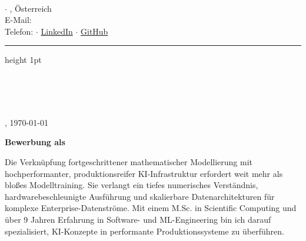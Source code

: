 \documentclass[11pt,a4paper]{article}
\begin{document}
\begin{minipage}[t]{0.55\textwidth}
    {\Large \bfseries \color{primary} \meinName}\\[0.2em]
    {\small \color{accent} \bfseries \stellenTitel}
\end{minipage}
\begin{minipage}[t]{0.45\textwidth}
    \raggedleft \footnotesize \color{textgray}
    \meineStrasse $\cdot$ \meinOrt, Österreich\\
    E-Mail: \href{mailto:\meineEmail}{\meineEmail}\\
    Telefon: \meineTel $\cdot$ \href{\meinLinkedin}{LinkedIn} $\cdot$ \href{\meinGithub}{GitHub}
\end{minipage}

\vspace{0.8em}
\color{accent}\hrule height 1pt
\vspace{1.0em}

\begin{minipage}[t]{0.55\textwidth}
    \color{primary} \small
    \textbf{\firmenName}\\[0.15em]
    \ansprechPartner\\[0.15em]
    \firmenAdresse\\[0.15em]
\end{minipage}
\begin{minipage}[t]{0.45\textwidth}
    \raggedleft \small \color{textgray}
    \meinOrt, \today
\end{minipage}

\vspace{1.2em}

\vspace{0.8cm}
{\Large\bfseries\color{primary} Bewerbung als \stellenTitel}


\vspace{0.6em}

\color{primary} \small

\anrede

Die Verknüpfung fortgeschrittener mathematischer Modellierung mit hochperformanter, produktionsreifer KI-Infrastruktur erfordert weit mehr als bloßes Modelltraining. Sie verlangt ein tiefes numerisches Verständnis, hardwarebeschleunigte Ausführung und skalierbare Datenarchitekturen für komplexe Enterprise-Datenströme. Mit einem M.Sc. in Scientific Computing und über 9 Jahren Erfahrung in Software- und ML-Engineering bin ich darauf spezialisiert, KI-Konzepte in performante Produktionssysteme zu überführen.
\end{document}
